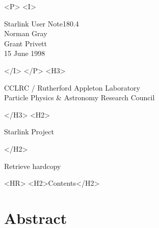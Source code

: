 \documentclass[twoside,11pt]{article}
\newcommand{\stardoccategory}  {Starlink User Note}
\newcommand{\stardocsource}    {sun\stardocnumber}
\newcommand{\stardocnumber}    {180.4}
\newcommand{\stardocauthors}   {Norman Gray\\Grant Privett}
\newcommand{\stardocdate}      {15 June 1998}
\newcommand{\htmladdnormallink}[2]{#1}
\newcommand{\htmladdimg}[1]{}
\newcommand{\htmlref}[2]{#1}
\newcommand{\htmladdtonavigation}[1]{}
\newcommand{\xlabel}[1]{}
\newcommand{\latexonlytoc}[0]{\tableofcontents}
\begin{document}
\begin{htmlonly}
   \begin{rawhtml} <P> <I> \end{rawhtml}
   \stardoccategory \stardocnumber \\
   \stardocauthors \\
   \stardocdate
   \begin{rawhtml} </I> </P> <H3> \end{rawhtml}
      \htmladdnormallink{CCLRC}{http://www.cclrc.ac.uk} /
      \htmladdnormallink{Rutherford Appleton Laboratory}
                        {http://www.cclrc.ac.uk/ral} \\
      \htmladdnormallink{Particle Physics \& Astronomy Research Council}
                        {http://www.pparc.ac.uk} \\
   \begin{rawhtml} </H3> <H2> \end{rawhtml}
      \htmladdnormallink{Starlink Project}{http://star-www.rl.ac.uk/}
   \begin{rawhtml} </H2> \end{rawhtml}
   \htmladdnormallink{\htmladdimg{source.gif} Retrieve hardcopy}
      {http://star-www.rl.ac.uk/cgi-bin/hcserver?\stardocsource}\\

  \label{stardoccontents}
  \begin{rawhtml}
    <HR>
    <H2>Contents</H2>
  \end{rawhtml}
  \renewcommand{\latexonlytoc}[0]{}
  \htmladdtonavigation{\htmlref{\htmladdimg{contents_motif.gif}}
        {stardoccontents}}

  \section{\xlabel{abstract}Abstract}
\end{htmlonly}
\end{document}
